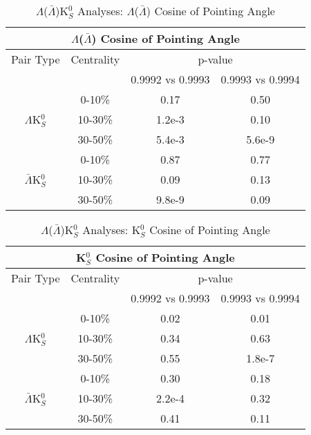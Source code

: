 \documentclass[../AnalysisNoteJBuxton.tex]{subfiles}
\begin{document}
\begin{table}
 \centering
 \begin{tabular}{|c|c|c|c|}
 \multicolumn{4}{c}{$\Lambda$($\bar{\Lambda}$) Cosine of Pointing Angle} \\
  \hline
  Pair Type & Centrality & \multicolumn{2}{c|}{p-value} \\
  \cline{3-4}
   & & 0.9992 vs 0.9993 & 0.9993 vs 0.9994 \\
  \hline
   & 0-10\% & 0.17 & 0.50 \\
  $\Lambda$K$^{0}_{S}$ 
   & 10-30\% & 1.2e-3 & 0.10 \\
   & 30-50\% & 5.4e-3 & 5.6e-9 \\
  \hline
   & 0-10\% & 0.87 & 0.77 \\
  $\bar{\Lambda}$K$^{0}_{S}$ 
   & 10-30\% & 0.09 & 0.13 \\
   & 30-50\% & 9.8e-9 & 0.09 \\
  \hline
 \end{tabular}
 \caption{$\Lambda$($\bar{\Lambda}$)K$^{0}_{S}$ Analyses: $\Lambda$($\bar{\Lambda}$) Cosine of Pointing Angle}
 \label{tab:LamCosPointingAngleLamK0}
\end{table}

\begin{table}
 \centering
 \begin{tabular}{|c|c|c|c|}
 \multicolumn{4}{c}{K$^{0}_{S}$ Cosine of Pointing Angle} \\
  \hline
  Pair Type & Centrality & \multicolumn{2}{c|}{p-value} \\
  \cline{3-4}
   & & 0.9992 vs 0.9993 & 0.9993 vs 0.9994 \\
  \hline
   & 0-10\% & 0.02 & 0.01 \\
  $\Lambda$K$^{0}_{S}$ 
   & 10-30\% & 0.34 & 0.63 \\
   & 30-50\% & 0.55 & 1.8e-7 \\
  \hline
   & 0-10\% & 0.30 & 0.18 \\
  $\bar{\Lambda}$K$^{0}_{S}$ 
   & 10-30\% & 2.2e-4 & 0.32 \\
   & 30-50\% & 0.41 & 0.11 \\
  \hline
 \end{tabular}
 \caption{$\Lambda$($\bar{\Lambda}$)K$^{0}_{S}$ Analyses: K$^{0}_{S}$ Cosine of Pointing Angle}
 \label{tab:K0CosPointingAngleLamK0}
\end{table}
\end{document}
